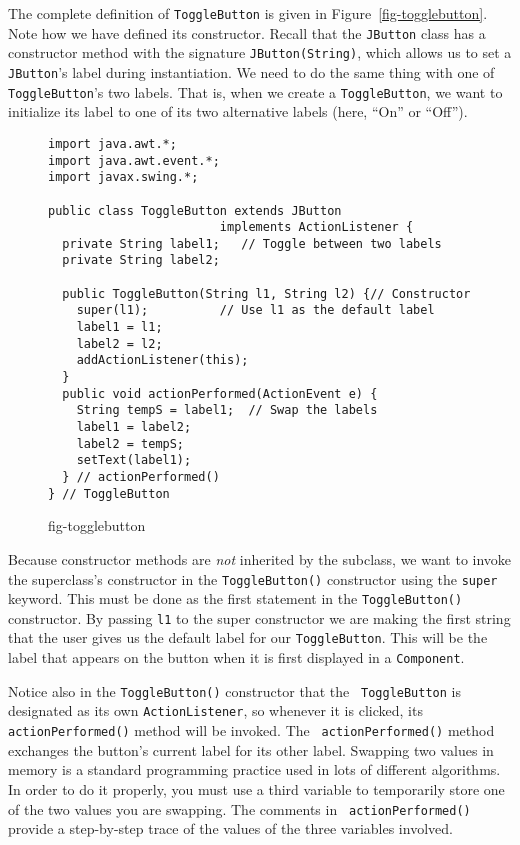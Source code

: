The complete definition of {\tt ToggleButton} is given in
Figure~\ref{fig-togglebutton}. Note how we have defined its
constructor. Recall that the {\tt JButton} class has a constructor
method with the signature {\tt JButton(String)}, which allows us to
set a {\tt JButton}'s label during instantiation.  We need to do the
same thing with one of {\tt ToggleButton}'s two labels.  That is, when
we create a {\tt ToggleButton}, we want to initialize its label to one
of its two alternative labels (here, ``On'' or ``Off'').

\begin{figure}[b!]
\jjjprogstart
\begin{jjjlisting}
\begin{lstlisting}
import java.awt.*;
import java.awt.event.*;
import javax.swing.*;

public class ToggleButton extends JButton 
                        implements ActionListener {   
  private String label1;   // Toggle between two labels
  private String label2;
   
  public ToggleButton(String l1, String l2) {// Constructor
    super(l1);          // Use l1 as the default label
    label1 = l1; 
    label2 = l2;
    addActionListener(this);
  } 
  public void actionPerformed(ActionEvent e) {
    String tempS = label1;  // Swap the labels
    label1 = label2;
    label2 = tempS;
    setText(label1);
  } // actionPerformed()
} // ToggleButton
\end{lstlisting}
\end{jjjlisting}
{fig-togglebutton}
\end{figure}

Because constructor methods are {\it not} inherited by the subclass,
we want to invoke the superclass's constructor in the {\tt ToggleButton()}
constructor using the {\tt super} keyword. This must be done as the
first statement in the {\tt ToggleButton()} constructor.
By passing {\tt l1} to the super constructor we are making the first string
that the user gives us the default label for our {\tt ToggleButton}.
This will be the label that appears on the button when it is first
displayed in a {\tt Component}.

Notice also in the {\tt ToggleButton()} constructor that the {\tt
ToggleButton} is designated as its own {\tt ActionListener}, so
whenever it is clicked, its
{\tt actionPerformed()} method will be invoked. The {\tt
actionPerformed()} method exchanges the button's current label for its
other label.  Swapping two values in memory is a standard programming
practice used in lots of different algorithms.  In order to do it
properly, you must use a third variable to temporarily store one of
the two values you are swapping. The comments in {\tt
actionPerformed()} provide a step-by-step trace of the values of the
three variables involved.

